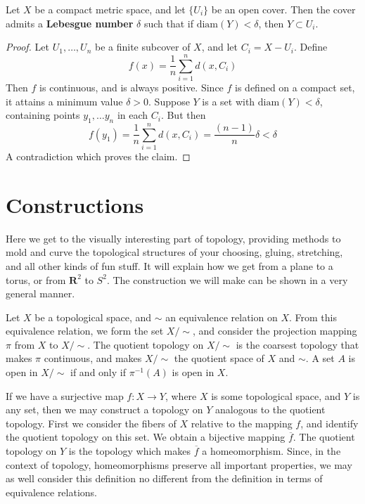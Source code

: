 \begin{example}
\begin{theorem}
    Let $X$ be a compact metric space, and let $\{ U_i \}$ be an open cover. Then the cover admits a {\bf Lebesgue number} $\delta$ such that if $\text{diam}(Y) < \delta$, then $Y \subset U_i$.
\end{theorem}
\begin{proof}
    Let $U_1, \dots, U_n$ be a finite subcover of $X$, and let $C_i = X - U_i$. Define
    \[ f(x) = \frac{1}{n} \sum_{i = 1}^n d(x,C_i) \]
    Then $f$ is continuous, and is always positive. Since $f$ is defined on a compact set, it attains a minimum value $\delta > 0$. Suppose $Y$ is a set with $\text{diam}(Y) < \delta$, containing points $y_1, \dots y_n$ in each $C_i$. But then
    \[ f(y_1) = \frac{1}{n} \sum_{i = 1}^n d(x,C_i) = \frac{(n-1)}{n} \delta < \delta \]
    A contradiction which proves the claim.
\end{proof}







\chapter{Constructions}

Here we get to the visually interesting part of topology, providing methods to mold and curve the topological structures of your choosing, gluing, stretching, and all other kinds of fun stuff. It will explain how we get from a plane to a torus, or from $\mathbf{R}^2$ to $S^2$. The construction we will make can be shown in a very general manner.

\begin{definition}
    Let $X$ be a topological space, and $\sim$ an equivalence relation on $X$. From this equivalence relation, we form the set $X/\sim$, and consider the projection mapping $\pi$ from $X$ to $X/\sim$. The quotient topology on $X/\sim$ is the coarsest topology that makes $\pi$ continuous, and makes $X/\sim$ the quotient space of $X$ and $\sim$. A set $A$ is open in $X/\sim$ if and only if $\pi^{-1}(A)$ is open in $X$.
\end{definition}

If we have a surjective map $f:X \to Y$, where $X$ is some topological space, and $Y$ is any set, then we may construct a topology on $Y$ analogous to the quotient topology. First we consider the fibers of $X$ relative to the mapping $f$, and identify the quotient topology on this set. We obtain a bijective mapping $\overline{f}$. The quotient topology on $Y$ is the topology which makes $\overline{f}$ a homeomorphism. Since, in the context of topology, homeomorphisms preserve all important properties, we may as well consider this definition no different from the definition in terms of equivalence relations.


\end{example}
